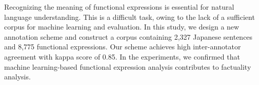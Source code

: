 Recognizing the meaning of functional expressions is essential for natural language understanding. This is a difficult task, owing to the lack of a sufficient corpus for machine learning and evaluation. In this study, we design a new annotation scheme and construct a corpus containing 2,327 Japanese sentences and 8,775 functional expressions. Our scheme achieves high inter-annotator agreement with kappa score of 0.85. In the experiments, we confirmed that machine learning-based functional expression analysis contributes to factuality analysis.
